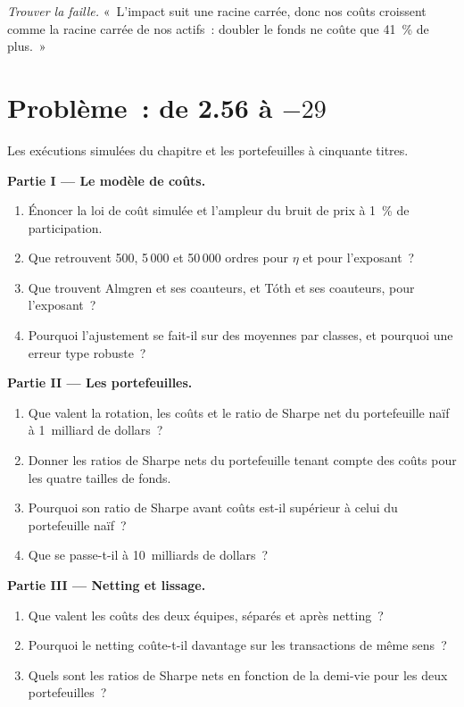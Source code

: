 \begin{exercise}[$\star\star\star$]\label{exo:rs:transaction-costs-in-research:8}
\emph{Trouver la faille.} «~L'impact suit une racine carrée, donc nos coûts croissent comme la racine carrée de nos actifs~: doubler le fonds ne coûte que 41~\% de plus.~»
\end{exercise}

\section{Problème~: de 2.56 à $-29$}

\begin{problem}\label{pb:rs:transaction-costs-in-research:1}
Les exécutions simulées du chapitre et les portefeuilles à cinquante titres.

\medskip\noindent\textbf{Partie I --- Le modèle de coûts.}
\begin{enumerate}
\item Énoncer la loi de coût simulée et l'ampleur du bruit de prix à 1~\% de participation.
\item Que retrouvent 500, 5\,000 et 50\,000 ordres pour $\eta$ et pour l'exposant~?
\item Que trouvent Almgren et ses coauteurs, et Tóth et ses coauteurs, pour l'exposant~?
\item Pourquoi l'ajustement se fait-il sur des moyennes par classes, et pourquoi une erreur type robuste~?
\end{enumerate}

\medskip\noindent\textbf{Partie II --- Les portefeuilles.}
\begin{enumerate}[resume]
\item Que valent la rotation, les coûts et le ratio de Sharpe net du portefeuille naïf à 1~milliard de dollars~?
\item Donner les ratios de Sharpe nets du portefeuille tenant compte des coûts pour les quatre tailles de fonds.
\item Pourquoi son ratio de Sharpe avant coûts est-il supérieur à celui du portefeuille naïf~?
\item Que se passe-t-il à 10~milliards de dollars~?
\end{enumerate}

\medskip\noindent\textbf{Partie III --- Netting et lissage.}
\begin{enumerate}[resume]
\item Que valent les coûts des deux équipes, séparés et après netting~?
\item Pourquoi le netting coûte-t-il davantage sur les transactions de même sens~?
\item Quels sont les ratios de Sharpe nets en fonction de la demi-vie pour les deux portefeuilles~?
\end{enumerate}


\end{problem}

